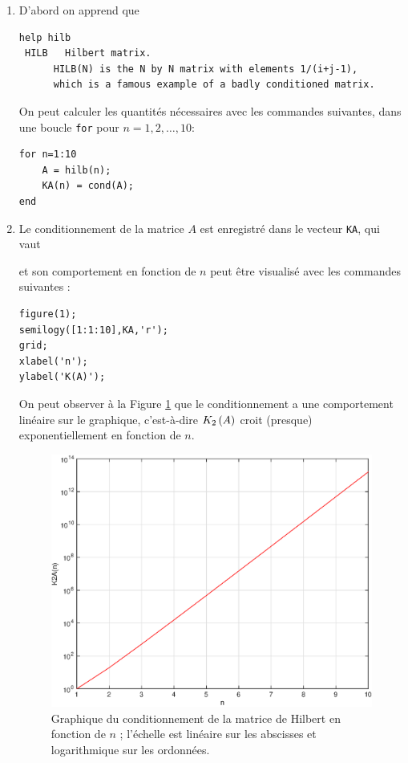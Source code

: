 \begin{enumerate}[label=\alph*)]
  \item D'abord on apprend que
  
\begin{verbatim}
help hilb
 HILB   Hilbert matrix.
      HILB(N) is the N by N matrix with elements 1/(i+j-1),
      which is a famous example of a badly conditioned matrix.
\end{verbatim}
  
  On peut calculer les quantités nécessaires avec les commandes suivantes, dans une boucle \texttt{for} pour $n = 1, 2, \dots, 10$: 
  
\begin{verbatim}
for n=1:10
    A = hilb(n);
    KA(n) = cond(A);
end 
\end{verbatim}

  \item Le conditionnement de la matrice $A$ est enregistré dans le vecteur \texttt{KA}, qui vaut
  
        
  
        et son comportement en fonction de $n$ peut être visualisé avec les commandes suivantes :

\begin{verbatim}
figure(1);
semilogy([1:1:10],KA,'r');
grid;
xlabel('n');
ylabel('K(A)');
\end{verbatim}

      On peut observer à la Figure \ref{fig:KA} que le conditionnement a une comportement linéaire sur le graphique, c'est-à-dire $K_{2}\left(A\right)$ croit (presque) exponentiellement en fonction de $n$.
      
      \begin{figure}[h!]
        \centering
        \includegraphics[scale = 0.5]{s4/matlab/KA.eps}
        \caption{Graphique du conditionnement de la matrice de Hilbert en fonction de $n$ ; l'échelle est linéaire sur les abscisses et logarithmique sur les ordonnées.}
        \label{fig:KA}
      \end{figure}


\end{enumerate}
